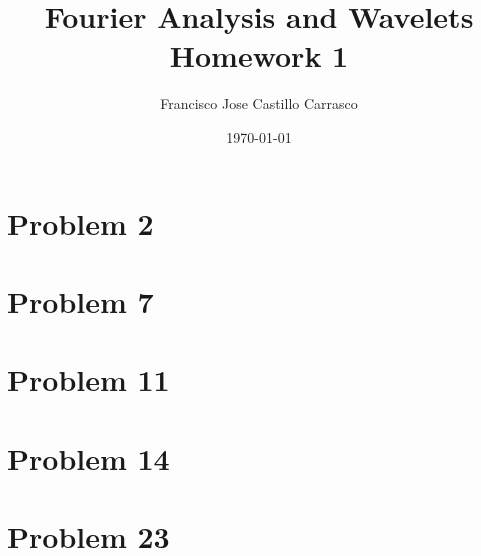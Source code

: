 




\title{Fourier Analysis and Wavelets\\Homework 1}
\author{Francisco Jose Castillo Carrasco}
\date{\today}
\maketitle




\section*{Problem 2}

\newpage
\section*{Problem 7}

\newpage
\section*{Problem 11}


\section*{Problem 14}


\section*{Problem 23}



